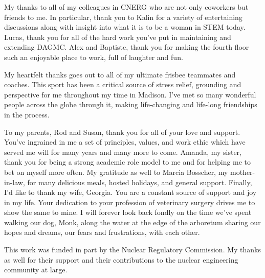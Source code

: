 My thanks to all of my colleagues in CNERG who are not only coworkers but
friends to me. In particular, thank you to Kalin for a variety of entertaining
discussions along with insight into what it is to be a woman in STEM
today. Lucas, thank you for all of the hard work you've put in maintaining and
extending DAGMC. Alex and Baptiste, thank you for making the fourth floor such
an enjoyable place to work, full of laughter and fun.

My heartfelt thanks goes out to all of my ultimate frisbee teammates and
coaches. This sport has been a critical source of stress relief, grounding and
perspective for me throughout my time in Madison. I've met so many wonderful
people across the globe through it, making life-changing and life-long
friendships in the process.

To my parents, Rod and Susan, thank you for all of your love and support. You've
ingrained in me a set of principles, values, and work ethic which have served me
will for many years and many more to come. Amanda, my sister, thank you for
being a strong academic role model to me and for helping me to bet on myself
more often. My gratitude as well to Marcia Bosscher, my mother-in-law, for many delicious
meals, hosted holidays, and general support. Finally, I'd like to thank my wife,
Georgia. You are a constant source of support and joy in my life. Your
dedication to your profession of veterinary surgery drives me to show the same
to mine. I will forever look back fondly on the time we've spent walking
our dog, Monk, along the water at the edge of the arboretum sharing our hopes
and dreams, our fears and frustrations, with each other.

This work was funded in part by the Nuclear Regulatory Commission. My thanks as
well for their support and their contributions to the nuclear engineering
community at large.
